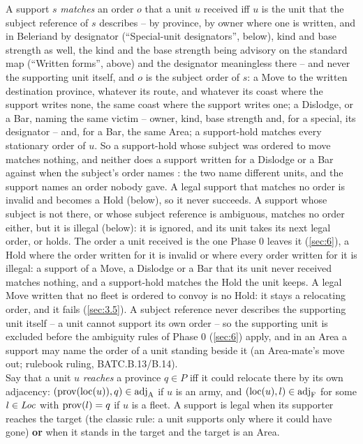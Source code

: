 \documentclass[12pt,a4paper]{article}
\begin{document}
A support $s$ \emph{matches} an order $o$ that a unit $u$ received iff $u$ is the unit that the subject reference of $s$ describes -- by province, by owner where one is written, and in Beleriand by designator (``Special-unit designators'', below), kind and base strength as well, the kind and the base strength being advisory on the standard map (``Written forms'', above) and the designator meaningless there -- and never the supporting unit itself, and $o$ is the subject order of $s$: a Move to the written destination province, whatever its route, and whatever its coast where the support writes none, the same coast where the support writes one; a Dislodge, or a Bar, naming the same victim -- owner, kind, base strength and, for a special, its designator -- and, for a Bar, the same Area; a support-hold matches every stationary order of $u$.
So a support-hold whose subject was ordered to move matches nothing, and neither does a support written for a Dislodge or a Bar against  when the subject's order names : the two name different units, and the support names an order nobody gave.
A legal support that matches no order is invalid and becomes a Hold (below), so it never succeeds.
A support whose subject is not there, or whose subject reference is ambiguous, matches no order either, but it is illegal (below): it is ignored, and its unit takes its next legal order, or holds.
The order a unit received is the one Phase 0 leaves it (\cref{sec:6}), a Hold where the order written for it is invalid or where every order written for it is illegal: a support of a Move, a Dislodge or a Bar that its unit never received matches nothing, and a support-hold matches the Hold the unit keeps.
A legal Move written  that no fleet is ordered to convoy is no Hold: it stays a relocating order, and it fails (\cref{sec:3.5}).
A subject reference never describes the supporting unit itself -- a unit cannot support its own order -- so the supporting unit is excluded before the ambiguity rules of Phase 0 (\cref{sec:6}) apply, and in an Area a support may name the order of a unit standing beside it (an Area-mate's move out; rulebook ruling, BATC.B.13/B.14).\\
Say that a unit $u$ \emph{reaches} a province $q \in P$ iff it could relocate there by its own adjacency: $(\operatorname{prov}(\operatorname{loc}(u)), q) \in \mathrm{adj}_{\mathrm{A}}$ if $u$ is an army, and $(\operatorname{loc}(u), l) \in \mathrm{adj}_{\mathrm{F}}$ for some $l \in \mathit{Loc}$ with $\operatorname{prov}(l) = q$ if $u$ is a fleet.
A support is legal when its supporter reaches the target (the classic rule: a unit supports only where it could have gone) \textbf{or} when it stands in the target and the target is an Area.
\end{document}
